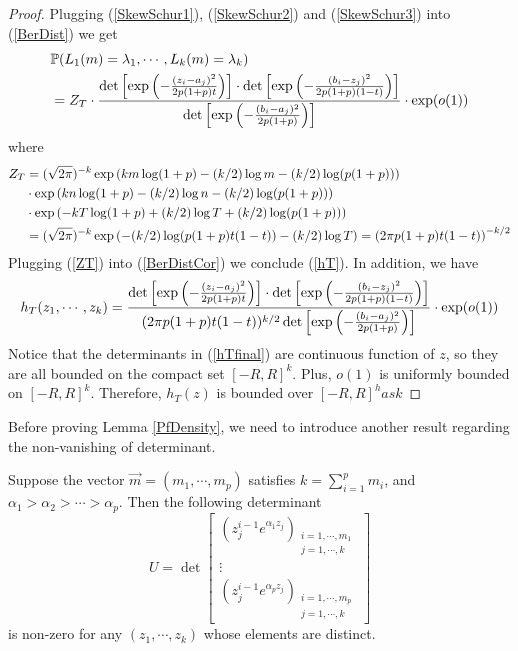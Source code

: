\begin{proof}
	Plugging (\ref{SkewSchur1}), (\ref{SkewSchur2}) and (\ref{SkewSchur3}) into (\ref{BerDist}) we get
	\begin{equation}{\label{BerDistCor}}
		\begin{split}
			& \mathbb{P}(L_{1}(m)=\lambda_1,\cdots,L_k(m)=\lambda_k)\\
			& =Z_{T}\cdot \frac{\det\left[\exp\left(-\frac{(z_{i}-a_j)^2}{2p(1+p)t}\right)\right]\cdot\det\left[\exp\left(-\frac{(b_{i}-z_j)^2}{2p(1+p)(1-t)}\right)\right]}{\det\left[\exp\left(-\frac{(b_{i}-a_j)^2}{2p(1+p)}\right)\right]}\cdot \exp(o(1))
		\end{split}
	\end{equation}
	where 
	\begin{equation}{\label{ZT}}
		\begin{split}
			Z_{T}&=(\sqrt{2\pi})^{-k}\exp\left(km\log(1+p)-(k/2)\log m-(k/2)\log(p(1+p))\right)\\
			&\cdot \exp\left(kn\log(1+p)-(k/2)\log n-(k/2)\log(p(1+p))\right)\\
			& \cdot \exp\left(-kT\log(1+p)+(k/2)\log T+(k/2)\log(p(1+p))\right)\\
			&=(\sqrt{2\pi})^{-k}\exp\left(-(k/2)\log(p(1+p)t(1-t))-(k/2)\log T\right)=\left(2\pi p(1+p)t(1-t)\right)^{-k/2}
		\end{split}
	\end{equation}
	Plugging (\ref{ZT}) into (\ref{BerDistCor}) we conclude (\ref{hT}). In addition, we have
	\begin{equation}{\label{hTfinal}}
		\begin{split}
			h_{T}(z_1,\cdots,z_k)=\frac{\det\left[\exp\left(-\frac{(z_{i}-a_j)^2}{2p(1+p)t}\right)\right]\cdot\det\left[\exp\left(-\frac{(b_{i}-z_j)^2}{2p(1+p)(1-t)}\right)\right]}{(2\pi p(1+p)t(1-t))^{k/2}\det\left[\exp\left(-\frac{(b_{i}-a_j)^2}{2p(1+p)}\right)\right]}\cdot \exp(o(1))
		\end{split}
	\end{equation}
	Notice that the determinants in (\ref{hTfinal}) are continuous function of $z$, so they are all bounded on the compact set $[-R,R]^{k}$. Plus, $o(1)$ is uniformly bounded on $[-R,R]^{k}$. Therefore, $h_{T}(z)$ is bounded over $[-R,R]^has k$
\end{proof}
Before proving Lemma \ref{PfDensity}, we need to introduce another result regarding the non-vanishing of determinant.

\begin{lemma}{\label{NonVanish}}
	Suppose the vector $\vec{m}=(m_1,\cdots,m_p)$ satisfies $k=\sum_{i=1}^{p}m_{i}$, and $\alpha_1>\alpha_2>\cdots>\alpha_p$. Then the following determinant
\[ U= \det
	\left[ \begin{array}{ccc}
		(z_{j}^{i-1}e^{\alpha_{1}z_{j}})_{\substack{i=1,\cdots,m_{1}\\j=1,\cdots,k}}\\
	\vdots\\
	(z_{j}^{i-1}e^{\alpha_{p}z_{j}})_{\substack{i=1,\cdots,m_{p}\\j=1,\cdots,k}}
	\end{array}
	\right]
\]
is non-zero for any $(z_{1},\cdots,z_{k})$ whose elements are distinct.
\end{lemma}

